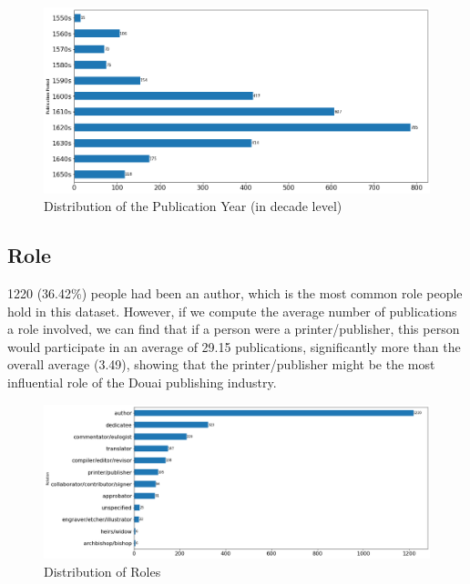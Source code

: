\documentclass[12pt,a4paper,oneside]{book}
\begin{document}
\begin{sloppypar}
\begin{figure}[H]
\centering
\includegraphics[scale=0.4]{graph/Distribution of the Publication Year (in Decade Level).png}
\caption{Distribution of the Publication Year (in decade level)}
\label{fig:pubDecade}
\end{figure}

\subsection*{Role}
1220 (36.42\%) people had been an author, which is the most common role people hold in this dataset. However, if we compute the average number of publications a role involved, we can find that if a person were a printer/publisher, this person would participate in an average of 29.15 publications, significantly more than the overall average (3.49), showing that the printer/publisher might be the most influential role of the Douai publishing industry.

\begin{figure}[H]
\centering
\includegraphics[scale=0.36]{graph/Distribution of Roles (in Person Level).png}
\caption{Distribution of Roles}
\label{fig:distRole}
\end{figure}


\end{sloppypar}
\end{document}
